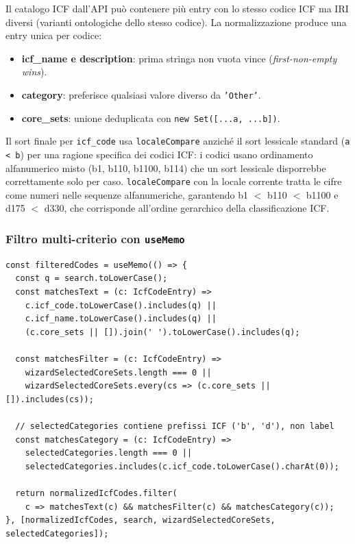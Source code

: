\documentclass[a4paper,12pt]{article}
\begin{document}
\noindent Il catalogo ICF dall'API pu\`{o} contenere pi\`{u} entry con lo stesso
codice ICF ma IRI diversi (varianti ontologiche dello stesso codice).
La normalizzazione produce una entry unica per codice:
\begin{itemize}[noitemsep]
  \item \textbf{icf\_name e description}: prima stringa non vuota vince
        (\textit{first-non-empty wins}).
  \item \textbf{category}: preferisce qualsiasi valore diverso da
        \texttt{'Other'}.
  \item \textbf{core\_sets}: unione deduplicata con \texttt{new Set([...a, ...b])}.
\end{itemize}
Il sort finale per \texttt{icf\_code} usa \texttt{localeCompare} anzich\'{e}
il sort lessicale standard (\texttt{a < b}) per una ragione specifica
dei codici ICF: i codici usano ordinamento alfanumerico misto (b1, b110,
b1100, b114) che un sort lessicale disporrebbe correttamente solo per
caso. \texttt{localeCompare} con la locale corrente tratta le cifre come
numeri nelle sequenze alfanumeriche, garantendo b1 $<$ b110 $<$ b1100
e d175 $<$ d330, che corrisponde all'ordine gerarchico della
classificazione ICF.

\subsubsection{Filtro multi-criterio con \texttt{useMemo}}

\begin{lstlisting}
const filteredCodes = useMemo(() => {
  const q = search.toLowerCase();
  const matchesText = (c: IcfCodeEntry) =>
    c.icf_code.toLowerCase().includes(q) ||
    c.icf_name.toLowerCase().includes(q) ||
    (c.core_sets || []).join(' ').toLowerCase().includes(q);

  const matchesFilter = (c: IcfCodeEntry) =>
    wizardSelectedCoreSets.length === 0 ||
    wizardSelectedCoreSets.every(cs => (c.core_sets || []).includes(cs));

  // selectedCategories contiene prefissi ICF ('b', 'd'), non label
  const matchesCategory = (c: IcfCodeEntry) =>
    selectedCategories.length === 0 ||
    selectedCategories.includes(c.icf_code.toLowerCase().charAt(0));

  return normalizedIcfCodes.filter(
    c => matchesText(c) && matchesFilter(c) && matchesCategory(c));
}, [normalizedIcfCodes, search, wizardSelectedCoreSets, selectedCategories]);
\end{lstlisting}
\end{document}
